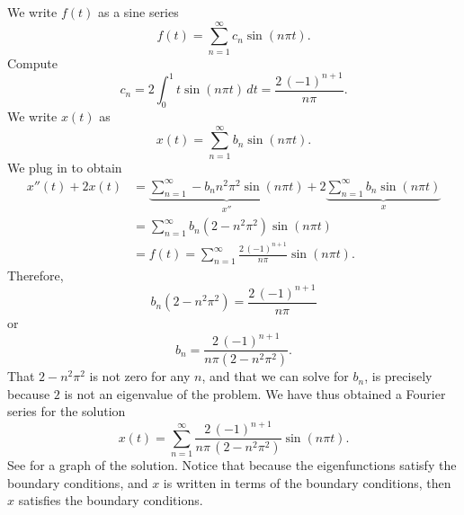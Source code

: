 \documentclass{ximera}
\begin{document}
\begin{exampleSol}
    We write $f(t)$ as a sine series
    \begin{equation*}
        f(t) = \sum_{n=1}^\infty c_n \sin (n \pi t) .
    \end{equation*}
    Compute
    \begin{equation*}
        c_n = 2 \int_0^1 t \sin (n \pi t) \,dt = \frac{2 \, {(-1)}^{n+1}}{n \pi} .
    \end{equation*}
    We write $x(t)$ as
    \begin{equation*}
        x(t) = \sum_{n=1}^\infty b_n \sin (n \pi t) .
    \end{equation*}
    We plug in to obtain 
    \begin{equation*}
        \begin{split}
            x''(t) + 2 x(t) 
            & = \underbrace{\sum_{n=1}^\infty - b_n n^2 \pi^2 \sin (n \pi t)}_{x''} + 2 \underbrace{\sum_{n=1}^\infty b_n \sin (n \pi t) }_{x} \\
            & = \sum_{n=1}^\infty b_n (2 - n^2 \pi^2 ) \sin (n \pi t) \\
            & = f(t) = \sum_{n=1}^\infty  \frac{2\, {(-1)}^{n+1}}{n \pi} \sin (n \pi t) .
        \end{split}
    \end{equation*}
    Therefore,
    \begin{equation*}
        b_n (2 - n^2 \pi^2) = \frac{2\,{(-1)}^{n+1}}{n \pi}
    \end{equation*}
    or
    \begin{equation*}
        b_n = \frac{2\,{(-1)}^{n+1}}{n \pi (2 - n^2 \pi^2)} .
    \end{equation*}
    That $2-n^2\pi^2$ is not zero for any $n$, and that we can solve for $b_n$, is precisely because $2$ is not an eigenvalue of the problem. We have thus obtained a Fourier series for the solution
    \begin{equation*}
        x(t) = \sum_{n=1}^\infty \frac{2\,{(-1)}^{n+1}}{n \pi \,(2 - n^2 \pi^2)} \sin (n \pi t) .
    \end{equation*}
    See  for a graph of the solution. Notice that because the eigenfunctions satisfy the boundary conditions, and $x$ is written in terms of the boundary conditions, then $x$ satisfies the boundary conditions.
    \begin{myfig}
        \capstart
        \caption{Plot of the solution of $x''+2x=t$, $x(0)=0$, $x(1)=0$.%
        \label{bnd-dirich-graph:fig}}
    \end{myfig}
\end{exampleSol}
\end{document}
